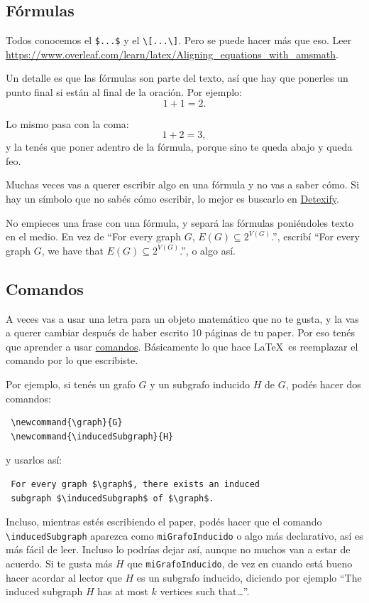 \documentclass{article}
\begin{document}
\subsection{Fórmulas}
Todos conocemos el \verb|$...$| y el \verb|\[...\]|. Pero se puede hacer más que eso. Leer \url{https://www.overleaf.com/learn/latex/Aligning_equations_with_amsmath}.

Un detalle es que las fórmulas son parte del texto, así que hay que ponerles un punto final si están al final de la oración. Por ejemplo:
\[1+1=2.\]

Lo mismo pasa con la coma:
\[1+2=3,\]
y la tenés que poner adentro de la fórmula, porque sino te queda abajo y queda feo.

Muchas veces vas a querer escribir algo en una fórmula y no vas a saber cómo. Si hay un símbolo que no sabés cómo escribir, lo mejor es buscarlo en \href{https://detexify.kirelabs.org/}{Detexify}.

No empieces una frase con una fórmula, y separá las fórmulas poniéndoles texto en el medio. En vez de  ``For every graph $G$, $E(G) \subseteq 2^{V(G)}$.'', escribí ``For every graph $G$, we have that $E(G) \subseteq 2^{V(G)}$.'', o algo así.

\subsection{Comandos}
A veces vas a usar una letra para un objeto matemático que no te gusta, y la vas a querer cambiar después de haber escrito 10 páginas de tu paper. Por eso tenés que aprender a usar \href{https://www.overleaf.com/learn/latex/Commands}{comandos}. Básicamente lo que hace \LaTeX\ es reemplazar el comando por lo que escribiste.

Por ejemplo, si tenés un grafo $G$ y un subgrafo inducido $H$ de $G$, podés hacer dos comandos:
\begin{verbatim}
 \newcommand{\graph}{G}
 \newcommand{\inducedSubgraph}{H}
\end{verbatim}

y usarlos así:
\begin{verbatim}
 For every graph $\graph$, there exists an induced
 subgraph $\inducedSubgraph$ of $\graph$.
\end{verbatim}

Incluso, mientras estés escribiendo el paper, podés hacer que el comando \verb|\inducedSubgraph| aparezca como \texttt{miGrafoInducido} o algo más declarativo, así es más fácil de leer. Incluso lo podrías dejar así, aunque no muchos van a estar de acuerdo. Si te gusta más $H$ que \texttt{miGrafoInducido}, de vez en cuando está bueno hacer acordar al lector que $H$ es un subgrafo inducido, diciendo por ejemplo ``The induced subgraph $H$ has at most $k$ vertices such that\dots''.
\end{document}
